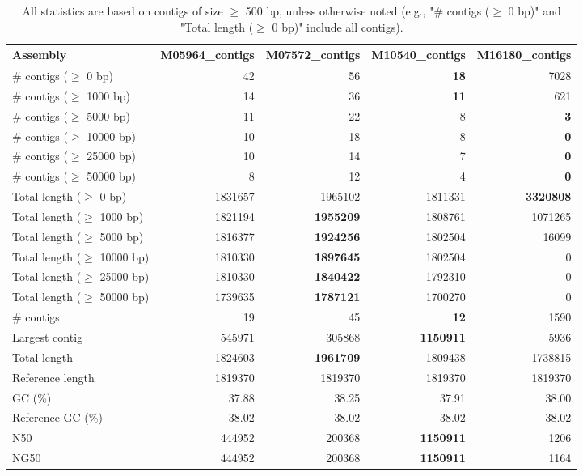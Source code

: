 \documentclass[12pt,a4paper]{article}
\begin{document}
\begin{table}[ht]
\begin{center}
\caption{All statistics are based on contigs of size $\geq$ 500 bp, unless otherwise noted (e.g., "\# contigs ($\geq$ 0 bp)" and "Total length ($\geq$ 0 bp)" include all contigs).}
\begin{tabular}{|l*{4}{|r}|}
\hline
Assembly & M05964\_contigs & M07572\_contigs & M10540\_contigs & M16180\_contigs \\ \hline
\# contigs ($\geq$ 0 bp) & 42 & 56 & {\bf 18} & 7028 \\ \hline
\# contigs ($\geq$ 1000 bp) & 14 & 36 & {\bf 11} & 621 \\ \hline
\# contigs ($\geq$ 5000 bp) & 11 & 22 & 8 & {\bf 3} \\ \hline
\# contigs ($\geq$ 10000 bp) & 10 & 18 & 8 & {\bf 0} \\ \hline
\# contigs ($\geq$ 25000 bp) & 10 & 14 & 7 & {\bf 0} \\ \hline
\# contigs ($\geq$ 50000 bp) & 8 & 12 & 4 & {\bf 0} \\ \hline
Total length ($\geq$ 0 bp) & 1831657 & 1965102 & 1811331 & {\bf 3320808} \\ \hline
Total length ($\geq$ 1000 bp) & 1821194 & {\bf 1955209} & 1808761 & 1071265 \\ \hline
Total length ($\geq$ 5000 bp) & 1816377 & {\bf 1924256} & 1802504 & 16099 \\ \hline
Total length ($\geq$ 10000 bp) & 1810330 & {\bf 1897645} & 1802504 & 0 \\ \hline
Total length ($\geq$ 25000 bp) & 1810330 & {\bf 1840422} & 1792310 & 0 \\ \hline
Total length ($\geq$ 50000 bp) & 1739635 & {\bf 1787121} & 1700270 & 0 \\ \hline
\# contigs & 19 & 45 & {\bf 12} & 1590 \\ \hline
Largest contig & 545971 & 305868 & {\bf 1150911} & 5936 \\ \hline
Total length & 1824603 & {\bf 1961709} & 1809438 & 1738815 \\ \hline
Reference length & 1819370 & 1819370 & 1819370 & 1819370 \\ \hline
GC (\%) & 37.88 & 38.25 & 37.91 & 38.00 \\ \hline
Reference GC (\%) & 38.02 & 38.02 & 38.02 & 38.02 \\ \hline
N50 & 444952 & 200368 & {\bf 1150911} & 1206 \\ \hline
NG50 & 444952 & 200368 & {\bf 1150911} & 1164 \\ \hline

\end{tabular}
\end{center}
\end{table}
\end{document}
